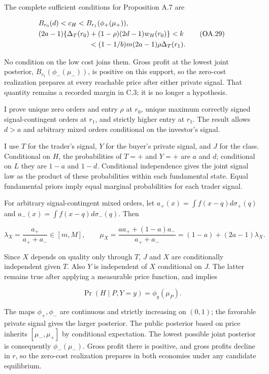 \documentclass[
  11pt,
]{article}
\begin{document}
The complete sufficient conditions for Proposition A.7 are

\[
\begin{aligned}
&B_{r_0}(d)<c_H<B_{r_1}(\phi_+(\mu_+)),\\
&(2a-1)\{\Delta_T(r_0)+(1-\rho)(2d-1)w_H(r_0)\}<k\\
&\hspace{25mm}<(1-1/b)m(2a-1)\rho\Delta_T(r_1).
\end{aligned}
\tag{OA.29}\label{eq:oa-oa-29}
\]

No condition on the low cost joins them. Gross profit at the lowest joint posterior,
\(B_{r_1}(\phi_-(\mu_-))\), is positive on this support, so the zero-cost
realization prepares at every reachable price after either private signal.
That quantity remains a recorded margin in C.3; it is no longer a hypothesis.

I prove unique zero orders and entry \(\rho\) at \(r_0\), unique maximum
correctly signed signal-contingent orders at \(r_1\), and strictly
higher entry at \(r_1\). The result allows \(d>a\) and arbitrary mixed
orders conditional on the investor's signal.

I use \(T\) for the trader's signal, \(Y\) for the buyer's private
signal, and \(J\) for the class. Conditional on \(H\),
the probabilities of \(T=+\) and \(Y=+\) are \(a\) and \(d\);
conditional on \(L\) they are \(1-a\) and \(1-d\). Conditional
independence gives the joint signal law as the product of these
probabilities within each fundamental state. Equal fundamental priors
imply equal marginal probabilities for each trader signal.

For arbitrary signal-contingent mixed orders, let
\(a_+(x)=\int f(x-q)d\sigma_+(q)\) and
\(a_-(x)=\int f(x-q)d\sigma_-(q)\). Then

\[
\lambda_X=\frac{a_+}{a_++a_-}\in[m,M],\qquad
\mu_X=\frac{a a_++(1-a)a_-}{a_++a_-}=(1-a)+(2a-1)\lambda_X.
\tag{OA.30}\label{eq:oa-oa-30}
\]

Since \(X\) depends on quality only through \(T\), \(J\) and \(X\)
are conditionally independent given \(T\). Also \(Y\) is independent of
\(X\) conditional on \(J\). The latter remains true after applying
a measurable price function, and implies

\[
\Pr(H\mid P,Y=y)=\phi_y(\mu_P).
\tag{OA.31}\label{eq:oa-oa-31}
\]

The maps \(\phi_+,\phi_-\) are continuous and strictly increasing on
\((0,1)\); the favorable private signal gives the larger posterior. The
public posterior based on price inherits \([\mu_-,\mu_+]\) by
conditional expectation. The lowest possible joint posterior is
consequently \(\phi_-(\mu_-)\). Gross profit there is positive, and
gross profits decline in \(r\), so the zero-cost realization prepares
in both economies under any candidate equilibrium.
\end{document}
